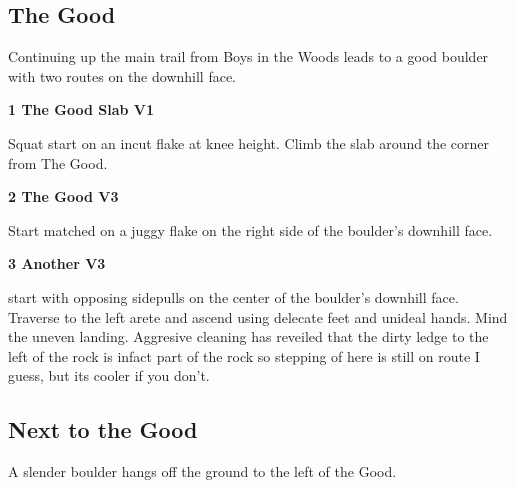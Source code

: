 	\begin{multicols}{2}


\needspace{1.5cm}
\subsection*{The Good}\label{bf:The Good}
Continuing up the main trail from Boys in the Woods leads to a good boulder with two routes on the downhill face.\\
	


\needspace{1.5cm}
\label{rt:The Good Slab}
\colorbox{green!20}{
\parbox{0.95\linewidth}{
\textbf{
1 The Good Slab V1  
}}}

\begin{adjustwidth}{0.5cm}{}			
Squat start on an incut flake at knee height. Climb the slab around the corner from The Good.
\end{adjustwidth}



\needspace{1.5cm}
\label{rt:The Good}
\colorbox{green!20}{
\parbox{0.95\linewidth}{
\textbf{
2 The Good V3  
}}}

\begin{adjustwidth}{0.5cm}{}			
Start matched on a juggy flake on the right side of the boulder's downhill face.
\end{adjustwidth}



\needspace{1.5cm}
\label{rt:Another}
\colorbox{green!20}{
\parbox{0.95\linewidth}{
\textbf{
3 Another V3  \warn
}}}

\begin{adjustwidth}{0.5cm}{}			
start with opposing sidepulls on the center of the boulder's downhill face. Traverse to the left arete and ascend using delecate feet and unideal hands. Mind the uneven landing. Aggresive cleaning has reveiled that the dirty ledge to the left of the rock is infact part of the rock so stepping of here is still on route I guess, but its cooler if you don't.
\end{adjustwidth}




\needspace{1.5cm}
\subsection*{Next to the Good}\label{bf:Next to the Good}
A slender boulder hangs off the ground to the left of the Good.\\
	



\end{multicols}
